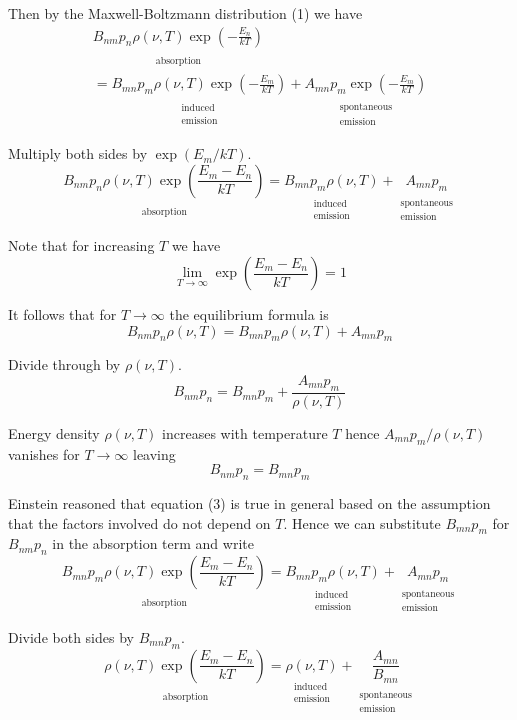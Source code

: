 \documentclass[12pt]{article}
\newcommand\BNM{B_{nm}} %
\newcommand\BMN{B_{mn}} %
\newcommand\AMN{A_{mn}} %
\newcommand\RHO{\rho(\nu,T)}
\newcommand\ABSORPTION{\substack{\\[1ex] \text{absorption}}}
\newcommand\INDUCED{\substack{\\[1ex] \text{induced}\\ \text{emission}}}
\newcommand\SPONTANEOUS{\substack{\\[1ex] \text{spontaneous}\\ \text{emission}}}
\begin{document}
\noindent
Then by the Maxwell-Boltzmann distribution (1) we have
\begin{multline*}
\underset{\ABSORPTION}{\BNM p_n \RHO\exp\left(-\frac{E_n}{kT}\right)}
\\
=\underset{\INDUCED}{\BMN p_m \RHO\exp\left(-\frac{E_m}{kT}\right)}
+\underset{\SPONTANEOUS}{\AMN p_m\exp\left(-\frac{E_m}{kT}\right)}
\tag{2}
\end{multline*}

\noindent
Multiply both sides by $\exp(E_m/kT)$.
\begin{equation*}
\underset{\ABSORPTION}{\BNM p_n \RHO\exp\left(\frac{E_m-E_n}{kT}\right)}
=\underset{\INDUCED}{\BMN p_m \RHO}
+\underset{\SPONTANEOUS}{\AMN p_m}
\end{equation*}

\noindent
Note that for increasing $T$ we have
\begin{equation*}
\lim_{T\rightarrow\infty}\exp\left(\frac{E_m-E_n}{kT}\right)=1
\end{equation*}

\noindent
It follows that for $T\rightarrow\infty$ the equilibrium formula is
\begin{equation*}
\BNM p_n \RHO
=\BMN p_m \RHO
+\AMN p_m
\end{equation*}

\noindent
Divide through by $\RHO$.
\begin{equation*}
\BNM p_n=\BMN p_m+\frac{\AMN p_m}{\RHO}
\end{equation*}

\noindent
Energy density $\RHO$ increases with temperature $T$
hence $\AMN p_m/\RHO$ vanishes for $T\rightarrow\infty$ leaving
\begin{equation*}
\BNM p_n=\BMN p_m
\tag{3}
\end{equation*}

\noindent
Einstein reasoned that equation (3) is true in general based on the assumption that
the factors involved do not depend on $T$.
Hence we can substitute $B_{mn}p_m$ for $B_{nm}p_n$ in the absorption term and write
\begin{equation*}
\underset{\ABSORPTION}{\BMN p_m \RHO\exp\left(\frac{E_m-E_n}{kT}\right)}
=\underset{\INDUCED}{\BMN p_m \RHO}
+\underset{\SPONTANEOUS}{\AMN p_m}
\end{equation*}

\noindent
Divide both sides by $\BMN p_m$.
\begin{equation*}
\underset{\ABSORPTION}{\RHO\exp\left(\frac{E_m-E_n}{kT}\right)}
=\underset{\INDUCED}{\RHO}+\underset{\SPONTANEOUS}{\frac{\AMN}{\BMN}}
\end{equation*}
\end{document}
